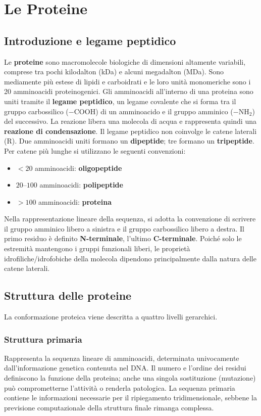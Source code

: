 \documentclass[12pt,a4paper]{report}
\begin{document}
\chapter{Le Proteine}
\section{Introduzione e legame peptidico}
Le \textbf{proteine} sono macromolecole biologiche di dimensioni altamente variabili, comprese tra pochi kilodalton (kDa) e alcuni megadalton (MDa). Sono mediamente più estese di lipidi e carboidrati e le loro unità monomeriche sono i 20 amminoacidi proteinogenici.
Gli amminoacidi all'interno di una proteina sono uniti tramite il \textbf{legame peptidico}, un legame covalente che si forma tra il gruppo carbossilico (\(-\mathrm{COOH}\)) di un amminoacido e il gruppo amminico (\(-\mathrm{NH_2}\)) del successivo. La reazione libera una molecola di acqua e rappresenta quindi una \textbf{reazione di condensazione}. Il legame peptidico non coinvolge le catene laterali (\(\mathrm{R}\)).
Due amminoacidi uniti formano un \textbf{dipeptide}; tre formano un \textbf{tripeptide}. Per catene più lunghe si utilizzano le seguenti convenzioni:
\begin{itemize}
\item \(< 20\) amminoacidi: \textbf{oligopeptide}
\item \(20\text{--}100\) amminoacidi: \textbf{polipeptide}
\item \(> 100\) amminoacidi: \textbf{proteina}
\end{itemize}
Nella rappresentazione lineare della sequenza, si adotta la convenzione di scrivere il gruppo amminico libero a sinistra e il gruppo carbossilico libero a destra. Il primo residuo è definito \textbf{N-terminale}, l'ultimo \textbf{C-terminale}. Poiché solo le estremità mantengono i gruppi funzionali liberi, le proprietà idrofiliche/idrofobiche della molecola dipendono principalmente dalla natura delle catene laterali.

\section{Struttura delle proteine}
La conformazione proteica viene descritta a quattro livelli gerarchici.
\subsection{Struttura primaria}
Rappresenta la sequenza lineare di amminoacidi, determinata univocamente dall'informazione genetica contenuta nel DNA. Il numero e l'ordine dei residui definiscono la funzione della proteina; anche una singola sostituzione (mutazione) può comprometterne l'attività o renderla patologica. La sequenza primaria contiene le informazioni necessarie per il ripiegamento tridimensionale, sebbene la previsione computazionale della struttura finale rimanga complessa.
\end{document}
